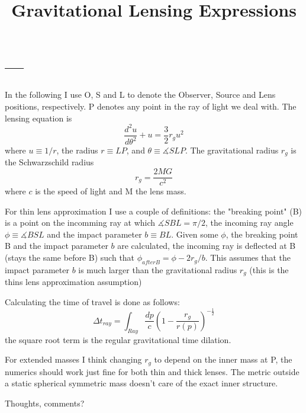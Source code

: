 \documentclass{article}
\begin{document}
\title{Gravitational Lensing Expressions}

\maketitle

\section{---}

In the following I use O, S and L to denote the Observer, Source and Lens positions, respectively. P denotes any point in the ray of light we deal with. The lensing equation is
\begin{equation}
    \label{eq1}
    \frac{d^2u}{d\theta^2}+u=\frac{3}{2}r_gu^2
\end{equation}
where $u\equiv1/r$, the radius $r\equiv LP$, and $\theta\equiv \measuredangle SLP$. The gravitational radius $r_g$ is the Schwarzschild radius 
\begin{equation}
    \label{eq2}
    r_g=\frac{2MG}{c^2}
\end{equation}
where $c$ is the speed of light and M the lens mass.

For thin lens approximation I use a couple of definitions: the "breaking point" (B) is a point on the incomming ray at which $\measuredangle SBL=\pi/2$, the incoming ray angle $\phi\equiv \measuredangle BSL$ and the impact parameter $b\equiv BL$. Given some $\phi$, the breaking point B and the impact parameter $b$ are calculated, the incoming ray is deflected at B (stays the same before B) such that $\phi_{afterB}=\phi-2r_g/b$. This assumes that the impact parameter $b$ is much larger than the gravitational radius $r_g$ (this is the thins lens approximation assumption)

Calculating the time of travel is done as follows:
\begin{equation}
    \label{eq3}
    \Delta t_{ray} = \int_{Ray} \frac{dp}{c} \left( 1- \frac{r_g}{r(p)}\right)^{-\frac{1}{2}} 
\end{equation}
the square root term is the regular gravitational time dilation.

For extended masses I think changing $r_g$ to depend on the inner mass at P, the numerics should work just fine for both thin and thick lenses. The metric outside a static spherical symmetric mass doesn't care of the exact inner structure.

Thoughts, comments?  
\end{document}
